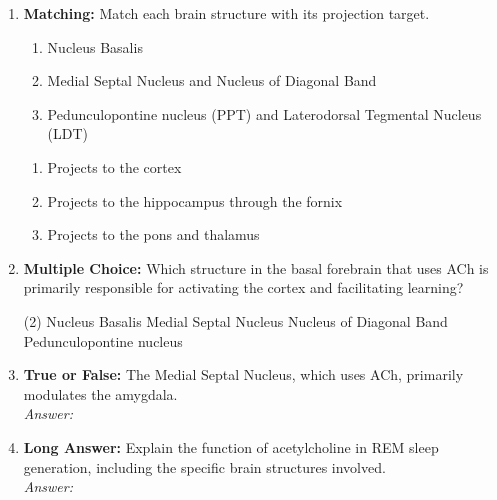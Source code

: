 \begin{enumerate}[label=\textbf{Q3.4.\arabic*}]
    \item \textbf{Matching:} Match each brain structure with its projection target.
    \begin{wordbox}
        \begin{enumerate}
            \item Nucleus Basalis
            \item Medial Septal Nucleus and Nucleus of Diagonal Band
            \item Pedunculopontine nucleus (PPT) and Laterodorsal Tegmental Nucleus (LDT)
        \end{enumerate}
    \end{wordbox}
    \begin{enumerate}[label=(\arabic*)]
        \item Projects to the cortex \quad \dotfill \quad \underline{\hspace{3cm}} 
        \item Projects to the hippocampus through the fornix \quad \dotfill \quad \underline{\hspace{3cm}} 
        \item Projects to the pons and thalamus \quad \dotfill \quad \underline{\hspace{3cm}} 
    \end{enumerate}

    \item \textbf{Multiple Choice:} Which structure in the basal forebrain that uses ACh is primarily responsible for activating the cortex and facilitating learning?
        \begin{tasks}[label=\textcolor{\documentTheme}{(\Alph*)}, item-format=\color{\documentTheme}, label-width=1.5em, item-indent=1.7em](2)
            \task Nucleus Basalis
            \task Medial Septal Nucleus
            \task Nucleus of Diagonal Band
            \task Pedunculopontine nucleus
        \end{tasks}

    \item \textbf{True or False:} The Medial Septal Nucleus, which uses ACh, primarily modulates the amygdala. \\
        \textit{Answer:} %

    \item \textbf{Long Answer:} Explain the function of acetylcholine in REM sleep generation, including the specific brain structures involved. \\
        \textit{Answer:} \\[2cm]%


\end{enumerate}

